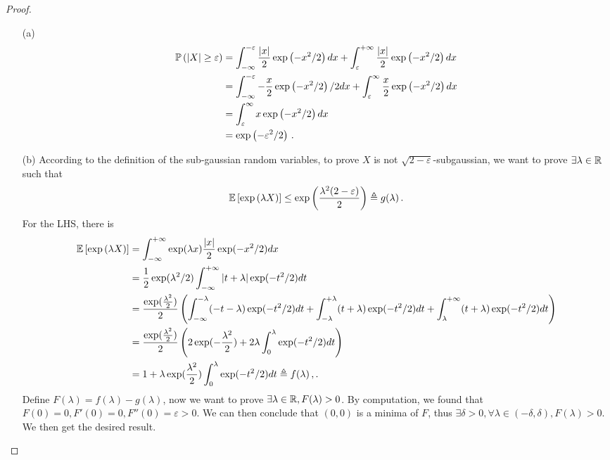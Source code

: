 \begin{proof}
\begin{enumerate}
	\item[(a)] 
	\begin{align*}
		\mathbb{P} \left(\left| X \right|\ge \varepsilon\right) &=\int^{-\varepsilon}_{-\infty} 
		\frac{\left| x \right|}{2}\exp\left(-x^2/2\right) d x +  \int_{\varepsilon}^{+\infty} \frac{\left| x \right|}{2} \exp\left(-x^2/2\right) d x \\
		&=\int^{-\varepsilon}_{-\infty} -\frac{x}{2} \exp\left(-x^2/2\right)/2 d x +  \int_{\varepsilon}^\infty \frac{x}{2} \exp\left(-x^2/2\right) d x \\
		&= \int_{\varepsilon}^\infty x \exp\left(-x^2/2\right) d x \\
		&= \exp\left(-\varepsilon^2/2\right)\,.
	\end{align*}
	\item[(b)] 
	According to the definition of the sub-gaussian random variables, to prove $X$ is not $\sqrt{2-\varepsilon}$-subgaussian, we want to prove $\exists \lambda \in \mathbb{R}$ such that 
	\begin{align*}
		\mathbb{E} \left[\exp\left(\lambda X\right)\right] \le \exp\left(\frac{\lambda^2 (2-\varepsilon)}{2}\right) \triangleq g(\lambda) \,.
	\end{align*}
	For the LHS, there is
	\begin{align*}
		\mathbb{E} \left[\exp\left(\lambda X\right)\right] &= 	\int_{-\infty}^{+\infty} \exp(\lambda x) \frac{|x|}{2} \exp(-x^2/2) dx \\
		&= \frac{1}{2}\exp(\lambda^2/2)\int_{-\infty}^{+\infty} \left| t+\lambda \right| \exp(-t^2/2)dt \\
		&= \frac{\exp(\frac{\lambda^2}{2})}{2} \left(\int_{-\infty}^{-\lambda} (-t-\lambda) \exp(-t^2/2)dt+\int_{-\lambda}^{+\lambda} (t+\lambda) \exp(-t^2/2)dt + \int_{\lambda}^{+\infty}(t+\lambda) \exp(-t^2/2)dt\right) \\
		&= \frac{\exp(\frac{\lambda^2}{2})}{2} \left({2\exp(-\frac{\lambda^2}{2})} + 2\lambda \int_0^\lambda \exp(-t^2/2)dt \right) \\
		&= 1 + \lambda \exp(\frac{\lambda^2}{2})\int_{0}^{\lambda} \exp(-t^2/2) dt \triangleq f(\lambda) \,,.
	\end{align*}
	Define $F(\lambda) = f(\lambda) - g(\lambda)$, now we want to prove $\exists \lambda \in \mathbb{R}, F(\lambda)>0$. By computation, we found that $F(0)=0, F'(0) = 0, F''(0)=\varepsilon >0$. We can then conclude that $(0,0)$ is a minima of $F$, thus $\exists \delta>0, \forall \lambda\in (-\delta,\delta), F(\lambda)>0$. We then get the desired result. 
\end{enumerate}
\end{proof}



